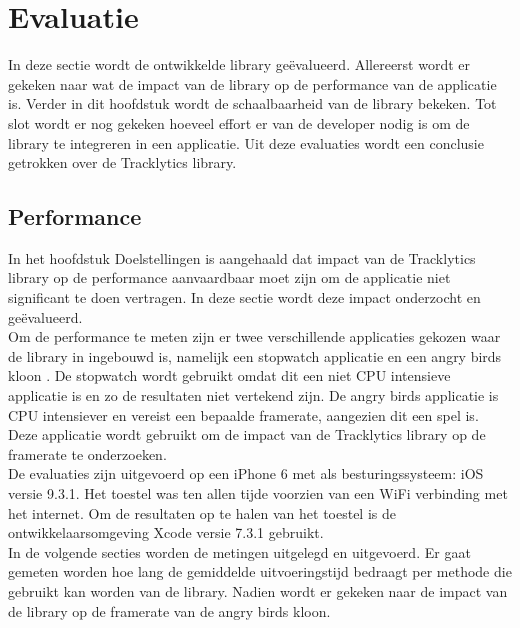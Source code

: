 \chapter{Evaluatie} \label{evaluatie}
In deze sectie wordt de ontwikkelde library ge\"evalueerd. Allereerst wordt er gekeken naar wat de impact van de library op de performance van de applicatie is. Verder in dit hoofdstuk wordt de schaalbaarheid van de library bekeken. Tot slot wordt er nog gekeken hoeveel effort er van de developer nodig is om de library te integreren in een applicatie. Uit deze evaluaties wordt een conclusie getrokken over de Tracklytics library.


\section{Performance}
In het hoofdstuk Doelstellingen is aangehaald dat impact van de Tracklytics library op de performance aanvaardbaar moet zijn om de applicatie niet significant te doen vertragen. In deze sectie wordt deze impact onderzocht en ge\"evalueerd. \\

Om de performance te meten zijn er twee verschillende applicaties gekozen waar de library in ingebouwd is, namelijk een stopwatch applicatie en een angry birds kloon \cite{AngryBirds}. De stopwatch wordt gebruikt omdat dit een niet CPU intensieve applicatie is en zo de resultaten niet vertekend zijn. De angry birds applicatie is CPU intensiever en vereist een bepaalde framerate, aangezien dit een spel is. Deze applicatie wordt gebruikt  om de impact van de Tracklytics library op de framerate te onderzoeken. \\

De evaluaties zijn uitgevoerd op een iPhone 6 \cite{iPhone} met als besturingssysteem: iOS versie 9.3.1. Het toestel was ten allen tijde voorzien van een WiFi verbinding met het internet. Om de resultaten op te halen van het toestel is de ontwikkelaarsomgeving Xcode \cite{Xcode} versie 7.3.1 gebruikt.\\

In de volgende secties worden de metingen uitgelegd en uitgevoerd. Er gaat gemeten worden hoe lang de gemiddelde uitvoeringstijd bedraagt per methode die gebruikt kan worden van de library. Nadien wordt er gekeken naar de impact van de library op de framerate van de angry birds kloon.\\


